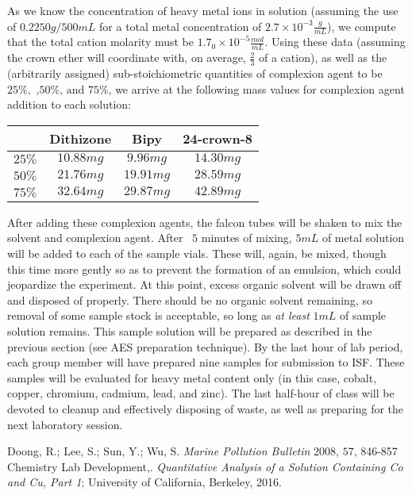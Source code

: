 \documentclass[letterpaper,12pt]{article}
\begin{document}
	\indent
	As we know the concentration of heavy metal ions in solution (assuming the use of $0.2250g/500mL$ for a total metal concentration of $2.7\times 10^{-3}\frac{g}{mL}$), we compute that the total cation molarity must be $1.7_0\times 10^{-5}\frac{mol}{mL}$. Using these data (assuming the crown ether will coordinate with, on average, $\frac{2}{3}$ of a cation), as well as the (arbitrarily assigned) sub-stoichiometric quantities of complexion agent to be $25\%,\text{ ,}50\%\text{, and }75\%$, we arrive at the following mass values for complexion agent addition to each solution:
	\begin{center}
		\begin{tabular}[htbp]{r|c|c|c}
			& \textbf{Dithizone} & \textbf{Bipy} & \textbf{24-crown-8}\\
			\hline
			$25\%$ & $10.88mg$ & $9.96mg$ & $14.30mg$\\
			\hline 
			$50\%$ & $21.76mg$ & $19.91mg$ & $28.59mg$\\
			\hline
			$75\%$ & $32.64mg$ & $29.87mg$ & $42.89mg$
		\end{tabular}
	\end{center}
	
	\indent
	After adding these complexion agents, the falcon tubes will be shaken to mix the solvent and complexion agent. After ~$5$ minutes of mixing, $5mL$ of metal solution will be added to each of the sample vials. These will, again, be mixed, though this time more gently so as to prevent the formation of an emulsion, which could jeopardize the experiment. At this point, excess organic solvent will be drawn off and disposed of properly. There should be no organic solvent remaining, so removal of some sample stock is acceptable, so long as \emph{at least} $1mL$ of sample solution remains. This sample solution will be prepared as described in the previous section (see AES preparation technique). By the last hour of lab period, each group member will have prepared nine samples for submission to ISF. These samples will be evaluated for heavy metal content only (in this case, cobalt, copper, chromium, cadmium, lead, and zinc). The last half-hour of class will be devoted to cleanup and effectively disposing of waste, as well as preparing for the next laboratory session.
	\newpage

	
	\begin{thebibliography}{99}
		 Doong, R.; Lee, S.; Sun, Y.; Wu, S. \emph{Marine Pollution Bulletin} 2008, $57$, 846-857
		 Chemistry Lab Development,. \emph{Quantitative Analysis of a Solution Containing Co and Cu, Part 1}; University of California, Berkeley, 2016.
	\end{thebibliography}
\end{document}
